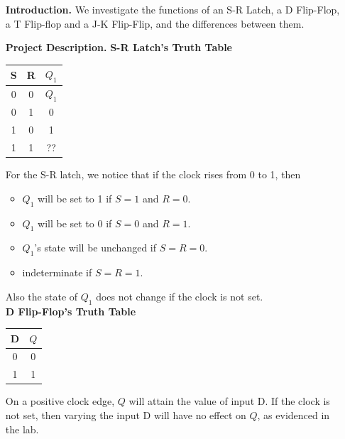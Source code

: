 \documentclass[9pt]{article}
\begin{document}
\begin{enumerate}
   \item[\textbf{Introduction.}]  We investigate the functions of an S-R Latch,
             a D Flip-Flop, a T Flip-flop and a J-K Flip-Flip, and the
             differences between them.
   \item[\textbf{Project Description.}] \textbf{S-R Latch's Truth Table}
         \begin{center}
    \begin{tabular}{@{}|c|c|c|@{}}
   \hline
         S & R & $Q_1$ \\ \hline
         0 & 0 & $Q_1$ \\ \hline
         0 & 1 & 0 \\ \hline
         1 & 0 & 1 \\ \hline
         1 & 1 & ?? \\ \hline         
\end{tabular}
   \end{center}
   
         For the S-R latch, we notice that if the clock rises from 0 to 1, then
         \begin{itemize}
            \item $Q_1$ will be set to 1 if $S = 1$ and $R = 0$.
            \item $Q_1$ will be set to 0 if $S = 0$ and $R = 1$.
            \item $Q_1$'s state will be unchanged if $S = R = 0$.
            \item indeterminate if $S = R = 1$.            
         \end{itemize}
         
         Also the state of $Q_1$ does not change if the clock is not set. \\
         
          \textbf{D Flip-Flop's Truth Table}
         \begin{center}
    \begin{tabular}{@{}|c|c|@{}}
   \hline
         D & $Q$  \\ \hline
         0 & 0  \\ \hline
         1 & 1  \\ \hline       
\end{tabular}
   \end{center}
   
      On a positive clock edge, $Q$ will attain the value of input D. If the
      clock is not set, then varying the input D will have no effect on $Q$, as
      evidenced in the lab. \\ \\
         

\end{enumerate}
\end{document}
